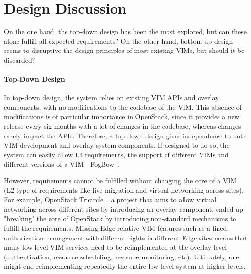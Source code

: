 


\section{Design Discussion}
\label{sec:design_discussion}
On the one hand, the top-down design has been the most explored, but can these alone fulfill all expected requirements? On the other hand, bottom-up design seems to disruptive the design principles of most existing VIMs, but should it be discarded?

\paragraph{Top-Down Design}
In top-down design, the system relies on existing VIM APIs and overlay
components, with no modifications to the codebase of the VIM. This
absence of modifications is of particular importance in OpenStack,
since it provides a new release every six months with a lot of changes
in the codebase, whereas changes rarely impact the APIs. Therefore, a
top-down design gives independence to both VIM development and overlay
system components. If designed to do so, the system can easily allow
L4 requirements, \ie the support of different VIMs and different
versions of a VIM - \eg FogBow~\cite{brasileiro2016fogbow}.

However, requirements cannot be fulfilled without changing the core of
a VIM (\eg L2 type of requirements like live migration and virtual
networking across sites). For example, OpenStack
Tricircle~\cite{tricircle}, a project that aims to allow virtual
networking across different sites by introducing an overlay component,
ended up "breaking" the core of OpenStack by introducing non-standard
mechanisms to fulfill the requirements. Missing Edge relative VIM
features such as a fined authorization management with different
rights in different Edge sites means that many low-level VIM services
need to be reimplemented at the overlay level (\eg authentication,
resource scheduling, resource monitoring, etc). Ultimately, one might
end reimplementing repeatedly the entire low-level system at higher
levels.




